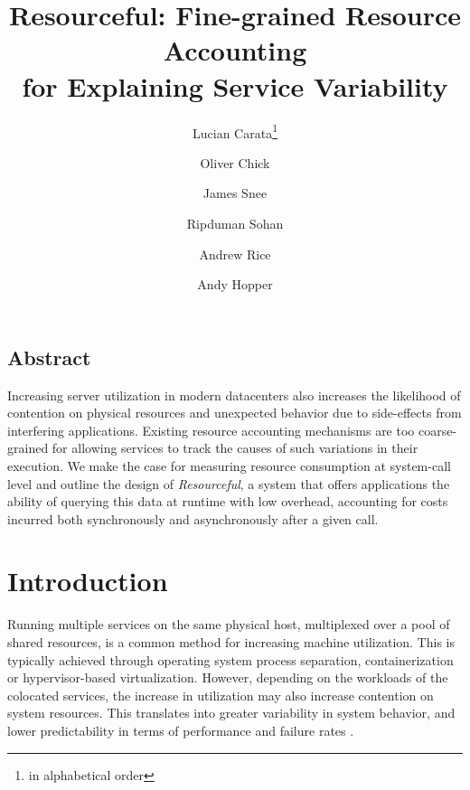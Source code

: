 \documentclass[letterpaper,twocolumn,10pt]{article}
\newcommand{\pname}{Resourceful}
\newcommand*\aorder[1][\value{footnote}]{\footnotemark[#1]}
\begin{document}
\date{}

\title{\Large \bf \pname: Fine-grained Resource Accounting\\for Explaining Service Variability}

\author{Lucian Carata\thanks{in alphabetical order}\aorder} \author{Oliver
Chick\aorder} \author{James Snee\aorder} \author{\authorcr{}Ripduman Sohan}
\author{Andrew Rice} \author{Andy Hopper} 

\maketitle

\thispagestyle{empty}


\subsection*{Abstract}
Increasing server utilization in modern datacenters also increases the
likelihood of contention on physical resources and unexpected behavior due to
side-effects from interfering applications. Existing resource accounting
mechanisms are too coarse-grained for allowing services to track the causes of
such variations in their execution. We make the case for measuring resource
consumption at system-call level and outline the design of \emph{Resourceful}, a
system that offers applications the ability of querying this data at runtime
with low overhead, accounting for costs incurred both synchronously and
asynchronously after a given call.

\section{Introduction} 
Running multiple services on the same physical host, multiplexed over a pool of
shared resources, is a common method for increasing machine utilization. This is
typically achieved through operating system process separation, containerization
or hypervisor-based virtualization. However, depending on the workloads
of the colocated services, the increase in utilization may also increase
contention on system resources. This translates into greater variability in
system behavior, and lower predictability in terms of performance and failure
rates \cite{dean2013}.
\end{document}
